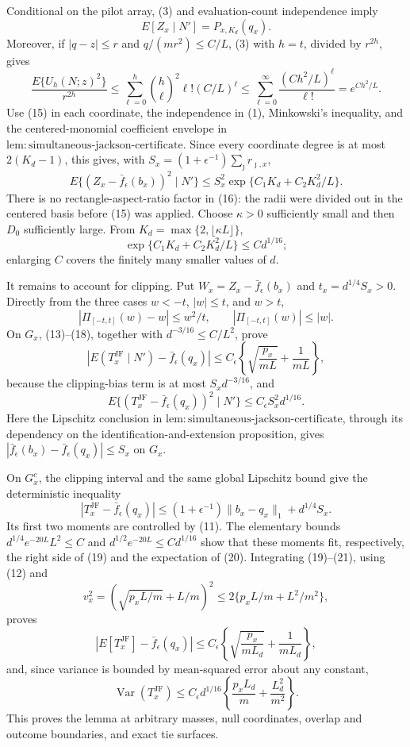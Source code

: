 Conditional on the pilot array, (3) and evaluation-count independence imply
\[
 E[Z_x\mid N']=P_{x,K_d}(q_x).
 \tag{14}
\]
Moreover, if \(|q-z|\leq r\) and \(q/(mr^2)\leq C/L\), (3) with \(h=t\), divided by \(r^{2h}\), gives
\[
 \frac{E\{U_h(N;z)^2\}}{r^{2h}}
 \leq\sum_{\ell=0}^h\binom h\ell^2\ell!(C/L)^\ell
 \leq\sum_{\ell=0}^{\infty}\frac{(Ch^2/L)^\ell}{\ell!}
 =e^{Ch^2/L}.
 \tag{15}
\]
Use (15) in each coordinate, the independence in (1), Minkowski's inequality, and the centered-monomial coefficient envelope in \(\mathrm{lem:simultaneous\text{-}jackson\text{-}certificate}\).  Since every coordinate degree is at most \(2(K_d-1)\), this gives, with \(S_x=(1+\epsilon^{-1})\sum_{\jmath}r_{\jmath,x}\),
\[
 E\{(Z_x-\bar f_\epsilon(b_x))^2\mid N'\}
 \leq S_x^2\exp\{C_1K_d+C_2K_d^2/L\}.
 \tag{16}
\]
There is no rectangle-aspect-ratio factor in (16): the radii were divided out in the centered basis before (15) was applied.  Choose \(\kappa>0\) sufficiently small and then \(D_0\) sufficiently large.  From \(K_d=\max\{2,\lfloor\kappa L\rfloor\}\),
\[
 \exp\{C_1K_d+C_2K_d^2/L\}\leq C d^{1/16};
 \tag{17}
\]
enlarging \(C\) covers the finitely many smaller values of \(d\).

It remains to account for clipping.  Put \(W_x=Z_x-\bar f_\epsilon(b_x)\) and \(t_x=d^{1/4}S_x>0\).  Directly from the three cases \(w<-t\), \(|w|\leq t\), and \(w>t\),
\[
 |\Pi_{[-t,t]}(w)-w|\leq w^2/t,
 \qquad |\Pi_{[-t,t]}(w)|\leq|w|.
 \tag{18}
\]
On \(G_x\), (13)--(18), together with \(d^{-3/16}\leq C/L^2\), prove
\[
 |E(T_x^{\mathrm{JF}}\mid N')-\bar f_\epsilon(q_x)|
 \leq C_\epsilon\left\{\sqrt{\frac{p_x}{mL}}+\frac1{mL}\right\},
 \tag{19}
\]
because the clipping-bias term is at most \(S_xd^{-3/16}\), and
\[
 E\{(T_x^{\mathrm{JF}}-\bar f_\epsilon(q_x))^2\mid N'\}
 \leq C_\epsilon S_x^2d^{1/16}.
 \tag{20}
\]
Here the Lipschitz conclusion in \(\mathrm{lem:simultaneous\text{-}jackson\text{-}certificate}\), through its dependency on the identification-and-extension proposition, gives
\(|\bar f_\epsilon(b_x)-\bar f_\epsilon(q_x)|\leq S_x\) on \(G_x\).

On \(G_x^c\), the clipping interval and the same global Lipschitz bound give the deterministic inequality
\[
 |T_x^{\mathrm{JF}}-\bar f_\epsilon(q_x)|
 \leq(1+\epsilon^{-1})\lVert b_x-q_x\rVert_1+d^{1/4}S_x.
 \tag{21}
\]
Its first two moments are controlled by (11).  The elementary bounds
\(d^{1/4}e^{-20L}L^2\leq C\) and
\(d^{1/2}e^{-20L}\leq Cd^{1/16}\) show that these moments fit, respectively, the right side of (19) and the expectation of (20).  Integrating (19)--(21), using (12) and
\[
 v_x^2=(\sqrt{p_xL/m}+L/m)^2
 \leq2\{p_xL/m+L^2/m^2\},
\]
proves
\[
 |E[T_x^{\mathrm{JF}}]-\bar f_\epsilon(q_x)|
 \leq C_\epsilon\left\{\sqrt{\frac{p_x}{mL_d}}+\frac1{mL_d}\right\},
\]
and, since variance is bounded by mean-squared error about any constant,
\[
 \operatorname{Var}(T_x^{\mathrm{JF}})
 \leq C_\epsilon d^{1/16}
 \left\{\frac{p_xL_d}{m}+\frac{L_d^2}{m^2}\right\}.
\]
This proves the lemma at arbitrary masses, null coordinates, overlap and outcome boundaries, and exact tie surfaces.